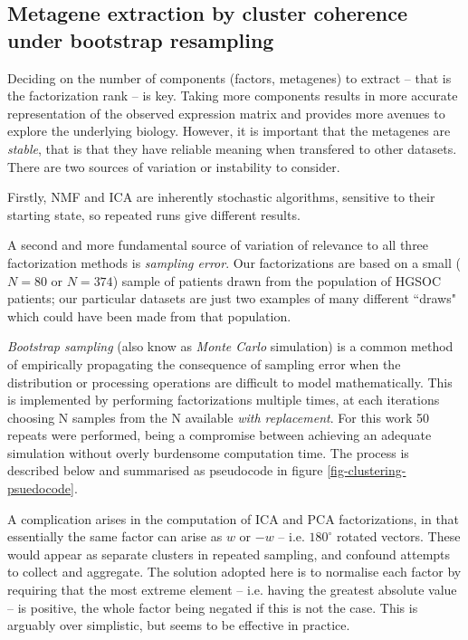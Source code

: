 \documentclass[tikz, 11pt,a4paper,oneside,fleqn]{article}
\begin{document}
\subsection{Metagene extraction by cluster coherence under bootstrap resampling}
\label{sec-metagene-selection}
Deciding on the number of components (factors, metagenes) to extract -- that is the factorization rank -- is key.  Taking more components results in more accurate representation of the observed expression matrix and provides more avenues to explore the underlying biology.  However, it is important that the metagenes are \emph{stable}, that is that they have reliable meaning when transfered to other datasets.   There are two sources of variation or instability to consider.

Firstly, NMF and ICA are inherently stochastic algorithms, sensitive to their starting state, so repeated runs give different results.

A second and more fundamental source of variation of relevance to all three factorization methods is \emph{sampling error}.   Our factorizations are based on a small ($N=80$ or $N=374$) sample of patients drawn from the population of HGSOC patients; our particular datasets are just two examples of many different ``draws" which could have been made from that population.

\emph{Bootstrap sampling} (also know as \emph{Monte Carlo} simulation) is a common method of empirically propagating the consequence of sampling error when the distribution or processing operations are difficult to model mathematically.   This is implemented by performing factorizations multiple times, at each iterations choosing N samples from the N available \emph{with replacement}.   For this work 50 repeats were performed, being a compromise between achieving an adequate simulation without overly burdensome computation time.  The process is described below and summarised as pseudocode in figure \ref{fig-clustering-psuedocode}.  

A complication arises in the computation of ICA and PCA factorizations, in that essentially the same factor can arise as $w$ or $-w$ -- i.e. $180^\circ$ rotated vectors. These would appear as separate clusters in repeated sampling, and confound attempts to collect and aggregate.  The solution adopted here is to normalise each factor by requiring that the most extreme element -- i.e. having the greatest absolute value -- is positive, the whole factor being negated if this is not the case.  This is arguably over simplistic, but seems to be effective in practice.
\end{document}
